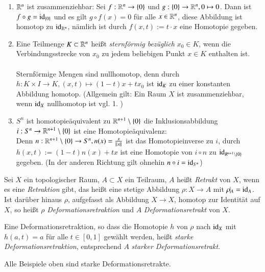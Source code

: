 \documentclass[a4paper,10pt]{scrartcl}
\begin{document}
\begin{exs*}
 \begin{enumerate}
  \item $\mathbb{R}^n$ ist zusammenziehbar: Sei $f: \mathbb{R}^n\to \{0\}$ und $g:\{0\}\to \mathbb{R}^n, 0 \mapsto 0$. Dann ist $f\circ g=\operatorname{id}_{\{0\}}$ und es gilt $g\circ f(x)=0$ für alle $x\in \mathbb{R}^n$, diese Abbildung ist homotop zu $\operatorname{id}_{\mathbb{R}^n}$, nämlich ist durch $f(x,t):= t\cdot x$ eine Homotopie gegeben.
  \item Eine Teilmenge $K\subset \mathbb{R}^n$ heißt \emph{sternförmig bezüglich} $x_0 \in K$, wenn die Verbindungsstrecke von $x_0$ zu jedem beliebigen Punkt $x\in K$ enthalten ist.\\
\fixme[fig44]\\
Sternförmige Mengen sind nullhomotop, denn durch $h: K\times I \to K, (x,t) \mapsto (1-t)x+tx_0$ ist $\operatorname{id}_K$ zu einer konstanten Abbildung homotop. (Allgemein gilt: Ein Raum $X$ ist zusammenziehbar, wenn $\operatorname{id}_X$ nullhomotop ist vgl. 1. )
\item $S^n$ ist homotopieäquivalent zu $\mathbb{R}^{n+1}\setminus\{0\}$ die Inklusionsabbildung $i: S^n\to \mathbb{R}^{n+1}\setminus\{0\}$ ist eine Homotopieäquivalenz:
\fixme[fig45]\\
Denn $n: \mathbb{R}^{n+1}\setminus\{0\} \to S^n, n(x)=\frac{x}{||x||}$ ist das Homotopieinverse zu $i$, durch $h(x,t):=(1-t)n(x)+tx$ ist eine Homotopie von $i\circ n$ zu $\operatorname{id}_{R^{n+1}\setminus \{0\}}$ gegeben.
(In der anderen Richtung gilt ohnehin $n\circ i= \operatorname{id}_{S^n}$)
\end{enumerate}
\end{exs*}
\begin{df}
 Sei $X$ ein topologischer Raum, $A\subset X$ ein Teilraum, $A$ heißt \emph{Retrakt} von $X$, wenn es eine \emph{Retraktion} gibt, das heißt eine stetige Abbildung  $\rho: X\to A$ mit $\rho\vline_A=\id_A$. Ist darüber hinaus $\rho$, aufgefasst als Abbildung $X\to X$, homotop zur Identität auf $X$, so heißt $\rho$ \emph{Deformationsretraktion} und  $A$ \emph{Deformationsretrakt} von $X$.

Eine Deformationsretraktion, so dass die Homotopie $h$ von $\rho$ nach $\operatorname{id}_X$ mit $h(a,t)=a$ für alle $t\in[0,1]$ gewählt werden, heißt \emph{starke Deformationsretraktion}, entsprechend $A$ \emph{starker Deformationsretrakt}.
\end{df}
\begin{note*}
 Alle Beispiele oben sind starke Deformationsretrakte.
\end{note*}
\end{document}
